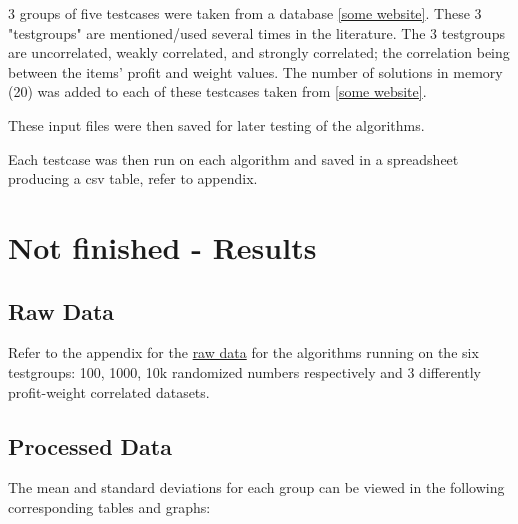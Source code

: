 \documentclass[titlepage]{article}
\begin{document}
3 groups of five testcases were taken from a database \ref{some website}. These 3 "testgroups" are mentioned/used several times in the literature. The 3 testgroups are uncorrelated, weakly correlated, and strongly correlated; the correlation being between the items' profit and weight values. The number of solutions in memory (20) was added to each of these testcases taken from \ref{some website}. 

These input files were then saved for later testing of the algorithms. 

Each testcase was then run on each algorithm and saved in a spreadsheet producing a csv table, refer to appendix.

\newpage

\section{Not finished - Results}

\subsection{Raw Data}
Refer to the appendix for the \hyperlink{random100}{raw data} for the algorithms running on the six testgroups: 100, 1000, 10k randomized numbers respectively and 3 differently profit-weight correlated datasets. 

\subsection{Processed Data}
The mean and standard deviations for each group can be viewed in the following corresponding tables and graphs:
\end{document}
